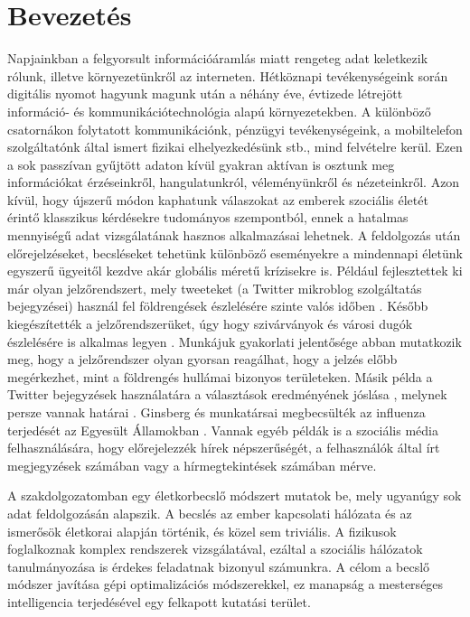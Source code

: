 \documentclass[12pt]{article}
\begin{document}
\section{Bevezetés}
Napjainkban a felgyorsult információáramlás miatt rengeteg adat keletkezik rólunk, illetve környezetünkről az interneten.
Hétköznapi tevékenységeink során digitális nyomot hagyunk magunk után a néhány éve, évtizede létrejött információ- és kommunikációtechnológia alapú környezetekben.
A különböző csatornákon folytatott kommunikációnk, pénzügyi tevékenységeink, a mobiltelefon szolgáltatónk által ismert fizikai elhelyezkedésünk stb., mind felvételre kerül.
Ezen a sok passzívan gyűjtött adaton kívül gyakran aktívan is osztunk meg információkat érzéseinkről, hangulatunkról, véleményünkről és nézeteinkről.
Azon kívül, hogy újszerű módon kaphatunk válaszokat az emberek szociális életét érintő klasszikus kérdésekre tudományos szempontból, ennek a hatalmas mennyiségű adat vizsgálatának hasznos alkalmazásai lehetnek. A feldolgozás után előrejelzéseket, becsléseket tehetünk különböző eseményekre a mindennapi életünk egyszerű ügyeitől kezdve akár globális méretű krízisekre is.
Például fejlesztettek ki már olyan jelzőrendszert, mely tweeteket (a Twitter mikroblog szolgáltatás bejegyzései) használ fel földrengések észlelésére szinte valós időben \cite{sakaki2010earthquake}.
Később kiegészítették a jelzőrendszerüket, úgy hogy szivárványok és városi dugók észlelésére is alkalmas legyen \cite{sakaki2013tweet}. Munkájuk gyakorlati jelentősége abban mutatkozik meg, hogy a jelzőrendszer olyan gyorsan reagálhat, hogy a jelzés előbb megérkezhet, mint a földrengés hullámai bizonyos területeken.
Másik példa a Twitter bejegyzések használatára a választások eredményének jóslása \cite{tumasjan2010predicting}, melynek persze vannak határai \cite{gayo2011limits, gayo2012wanted}.
Ginsberg és munkatársai megbecsülték az influenza terjedését az Egyesült Államokban \cite{ginsberg2009detecting}. Vannak egyéb példák is a szociális média felhasználására, hogy előrejelezzék hírek népszerűségét, a felhasználók által írt megjegyzések számában \cite{tsagkias2009predicting, tsagkias2010news} vagy a hírmegtekintések számában \cite{castillo2014characterizing} mérve.
\cite{bigData_wikipedia}

A szakdolgozatomban egy életkorbecslő módszert mutatok be, mely ugyanúgy sok adat feldolgozásán alapszik. A becslés az ember kapcsolati hálózata és az ismerősök életkorai alapján történik, és közel sem triviális. A fizikusok foglalkoznak komplex rendszerek vizsgálatával, ezáltal a szociális hálózatok tanulmányozása is érdekes feladatnak bizonyul számunkra. A célom a becslő módszer javítása gépi optimalizációs módszerekkel, ez manapság a mesterséges intelligencia terjedésével egy felkapott kutatási terület. %
\end{document}
